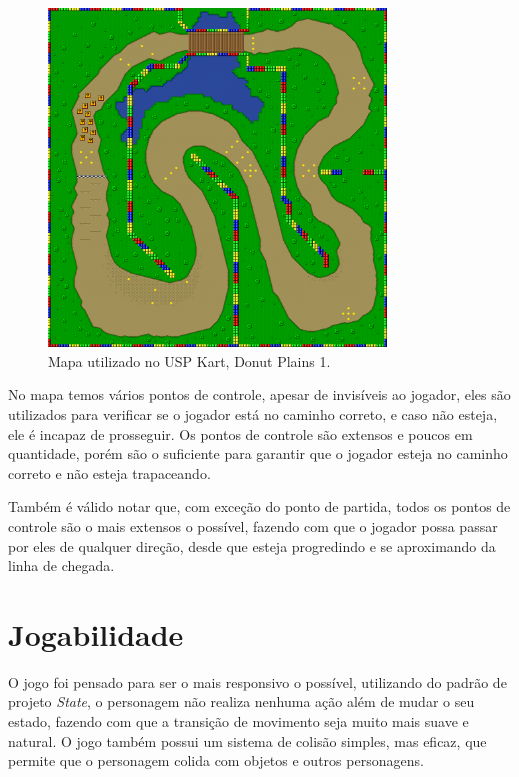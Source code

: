 \begin{figure}[H]
    \centering
    \includegraphics[width=0.8\textwidth]{figuras/Mapa.png}
    \caption{Mapa utilizado no USP Kart, Donut Plains 1. \cite{marioKart}}
    \label{fig:mapa}
\end{figure}


No mapa temos vários pontos de controle, apesar de invisíveis ao jogador, eles são utilizados para verificar se o jogador está no caminho correto, e caso não esteja, ele é incapaz de prosseguir. Os pontos de controle são extensos e poucos em quantidade, porém são o suficiente para garantir que o jogador esteja no caminho correto e não esteja trapaceando.

Também é válido notar que, com exceção do ponto de partida, todos os pontos de controle são o mais extensos o possível, fazendo com que o jogador possa passar por eles de qualquer direção, desde que esteja progredindo e se aproximando da linha de chegada.

\section{Jogabilidade}

O jogo foi pensado para ser o mais responsivo o possível, utilizando do padrão de projeto \textit{State}, o personagem não realiza nenhuma ação além de mudar o seu estado, fazendo com que a transição de movimento seja muito mais suave e natural. O jogo também possui um sistema de colisão simples, mas eficaz, que permite que o personagem colida com objetos e outros personagens.

